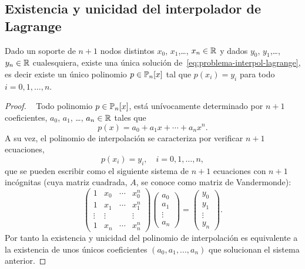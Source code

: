     \subsection{Existencia y unicidad del interpolador de Lagrange}
    \label{sec:exist-y-unic-lagrange}

    \begin{theorem}
      \label{thm:existencia-unicidad-lagrange}
      Dado un soporte de $n+1$ nodos distintos $x_0$, $x_1$,\dots, $x_n
      \in \operatorname{{\mathbb R}}$ y dados $y_0$, $y_1$,\dots, $y_n\in\operatorname{{\mathbb R}}$ cualesquiera,
      existe una única solución de~\eqref{eq:problema-interpol-lagrange},
      es decir existe un único polinomio $p\in\operatorname{{\mathbb P}}_n[x]$ tal que
      $p(x_i)=y_i$ para todo $i=0,1,\dots,n$.
    \end{theorem}
    \begin{proof}~
      Todo polinomio $p\in\operatorname{{\mathbb P}}_n[x]$, está unívocamente determinado por
      $n+1$ coeficientes, $a_0$, $a_1$, \dots, $a_n\in\operatorname{{\mathbb R}}$ tales que
      \begin{equation}
        p(x)=a_0 + a_1 x + \cdots + a_n x^n.
      \end{equation}
      A su vez, el polinomio de interpolación se caracteriza por verificar
      $n+1$ ecuaciones,
      $$
      p(x_i)=y_i, \quad i=0,1,\dots,n,
      $$
      que se pueden escribir como el siguiente sistema de $n+1$ ecuaciones
      con $n+1$ incógnitas (cuya matriz cuadrada, $A$, se conoce como
      matriz de Vandermonde):
      \begin{equation}
        \begin{pmatrix}
          1 & x_0& \cdots & x_0^n \\
          1 & x_1& \cdots & x_1^n \\
          \vdots & \vdots & & \vdots \\
          1 & x_n& \cdots & x_n^n 
        \end{pmatrix}
        \begin{pmatrix}
          a_0 \\ a_1 \\ \vdots \\ a_n
        \end{pmatrix}
        =
        \begin{pmatrix}
          y_0 \\ y_1 \\ \vdots \\ y_n
        \end{pmatrix}.
      \end{equation}
      Por tanto la existencia y unicidad del polinomio de interpolación es
      equivalente a la existencia de unos únicos coeficientes
      $(a_0,a_1,...,a_n)$ que solucionan el sistema anterior.


\end{proof}
